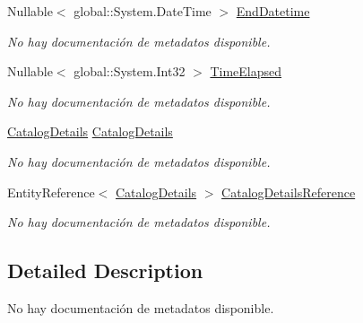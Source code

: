 \begin{DoxyCompactItemize}
Nullable$<$ global\-::\-System.\-Date\-Time $>$ \hyperlink{class_game_memory_1_1_catalog_detail_interactions_a14d6e49b9317999c0c9fb466c863b98a}{End\-Datetime}
\begin{DoxyCompactList}\small\item\em No hay documentación de metadatos disponible. \end{DoxyCompactList}\item 
Nullable$<$ global\-::\-System.\-Int32 $>$ \hyperlink{class_game_memory_1_1_catalog_detail_interactions_abf1ec4f566957f8c8d8d70a6f3f775e6}{Time\-Elapsed}
\begin{DoxyCompactList}\small\item\em No hay documentación de metadatos disponible. \end{DoxyCompactList}\item 
\hyperlink{class_game_memory_1_1_catalog_details}{Catalog\-Details} \hyperlink{class_game_memory_1_1_catalog_detail_interactions_a232363d89fa16413a33ec13cbf7a8128}{Catalog\-Details}
\begin{DoxyCompactList}\small\item\em No hay documentación de metadatos disponible. \end{DoxyCompactList}\item 
Entity\-Reference$<$ \hyperlink{class_game_memory_1_1_catalog_details}{Catalog\-Details} $>$ \hyperlink{class_game_memory_1_1_catalog_detail_interactions_a3b322f224a3556ae0a67754c37dec51d}{Catalog\-Details\-Reference}
\begin{DoxyCompactList}\small\item\em No hay documentación de metadatos disponible. \end{DoxyCompactList}\end{DoxyCompactItemize}


\subsection{Detailed Description}
No hay documentación de metadatos disponible. 



